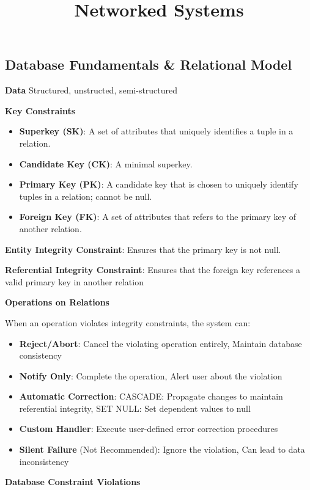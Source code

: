 \documentclass{article}
\title{Networked Systems}
\author{}
\date{}
\begin{document}
\footnotesize
 
\subsection*{Database Fundamentals \& Relational Model}

\noindent \textbf{Data} Structured, unstructed, semi-structured

\noindent \textbf{Key Constraints}

\begin{itemize}
    \item \textbf{Superkey (SK)}: A set of attributes that uniquely identifies a tuple in a relation.
    \item \textbf{Candidate Key (CK)}: A minimal superkey.
    \item \textbf{Primary Key (PK)}: A candidate key that is chosen to uniquely identify tuples in a relation; cannot be null.
    \item \textbf{Foreign Key (FK)}: A set of attributes that refers to the primary key of another relation.
\end{itemize}

\noindent \textbf{Entity Integrity Constraint}: Ensures that the primary key is not null.

\noindent \textbf{Referential Integrity Constraint}: Ensures that the foreign key references a valid primary key in another relation

\noindent \textbf{Operations on Relations}

\noindent When an operation violates integrity constraints, the system can:

\begin{itemize}
    \item \textbf{Reject/Abort}: Cancel the violating operation entirely, Maintain database consistency
    \item \textbf{Notify Only}: Complete the operation, Alert user about the violation
    \item \textbf{Automatic Correction}: CASCADE: Propagate changes to maintain referential integrity, SET NULL: Set dependent values to null
    \item \textbf{Custom Handler}: Execute user-defined error correction procedures
    \item \textbf{Silent Failure} (Not Recommended): Ignore the violation, Can lead to data inconsistency
\end{itemize}

\noindent \textbf{Database Constraint Violations}
\end{document}
